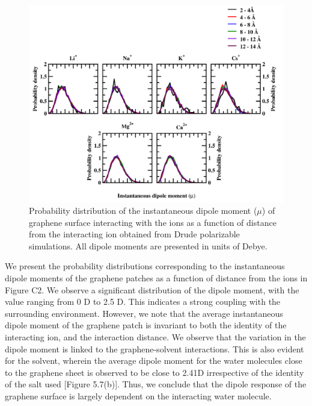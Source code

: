 \begin{figure}
    \centering
    \includegraphics[width=\textwidth]{Appendix/Figures/C2_port.png}
    \caption[Probability distribution of the instantaneous dipole moment ($\mu$) of graphene surface interacting with the ions as a function of distance from the interacting ion obtained from Drude polarizable simulations]{Probability distribution of the instantaneous dipole moment ($\mu$) of graphene surface interacting with the ions as a function of distance from the interacting ion obtained from Drude polarizable simulations. All dipole moments are presented in units of Debye.}
\end{figure}

We present the probability distributions corresponding to the instantaneous dipole moments of the graphene patches as a function of distance from the ions in Figure C2. We observe a significant distribution of the dipole moment, with the value ranging from 0 D to 2.5 D. This indicates a strong coupling with the surrounding environment. However, we note that the average instantaneous dipole moment of the graphene patch is invariant to both the identity of the interacting ion, and the interaction distance. We observe that the variation in the dipole moment is linked to the graphene-solvent interactions. This is also evident for the solvent, wherein the average dipole moment for the water molecules close to the graphene sheet is observed to be close to 2.41D irrespective of the identity of the salt used [Figure 5.7(b)]. Thus, we conclude that the dipole response of the graphene surface is largely dependent on the interacting water molecule.